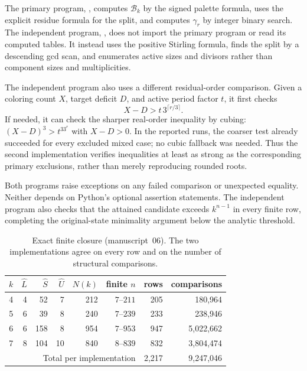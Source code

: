 \documentclass[11pt,a4paper]{article}
\numberwithin{equation}{section}
\theoremstyle{definition}
\theoremstyle{remark}
\newcommand{\Bip}{\mathcal B}
\begin{document}
The primary program, ,
computes $\Bip_k$ by the signed palette formula, uses the explicit residue
formula for the split, and computes $\gamma_r$ by integer binary search. The
independent program, ,
does not import the primary program or read its computed tables. It instead
uses the positive Stirling formula, finds the split by a descending gcd scan,
and enumerates active sizes and divisors rather than component sizes and
multiplicities.

The independent program also uses a different residual-order comparison.
Given a coloring count $X$, target deficit $D$, and active period factor $t$,
it first checks
\[
 X-D>t\,3^{\lceil r/3\rceil}.
\]
If needed, it can check the sharper real-order inequality by cubing:
$(X-D)^3>t^33^r$ with $X-D>0$. In the reported runs, the coarser test already
succeeded for every excluded mixed case; no cubic fallback was needed. Thus
the second implementation verifies inequalities at least as strong as the
corresponding primary exclusions, rather than merely reproducing rounded
roots.

Both programs raise exceptions on any failed comparison or unexpected
equality. Neither depends on Python's optional assertion statements. The
independent program also checks that the attained candidate exceeds $k^{n-1}$
in every finite row, completing the original-state minimality argument below
the analytic threshold.

\begin{table}[htbp]
\centering
\small
\begin{tabular}{@{}rrrrrrrr@{}}
\toprule
$k$ & $\hat L$ & $\hat S$ & $\hat U$ & $N(k)$ & finite $n$ & rows & comparisons\\
\midrule
4 & 4 & 52 & 7 & 212 & $7$--$211$ & 205 & 180,964\\
5 & 6 & 39 & 8 & 240 & $7$--$239$ & 233 & 238,946\\
6 & 6 & 158 & 8 & 954 & $7$--$953$ & 947 & 5,022,662\\
7 & 8 & 104 & 10 & 840 & $8$--$839$ & 832 & 3,804,474\\
\midrule
\multicolumn{6}{r}{Total per implementation} & 2,217 & 9,247,046\\
\bottomrule
\end{tabular}
\caption{Exact finite closure (manuscript~06). The two implementations agree
on every row and on the number of structural comparisons.}
\label{evo:tab:closure}
\end{table}
\end{document}
